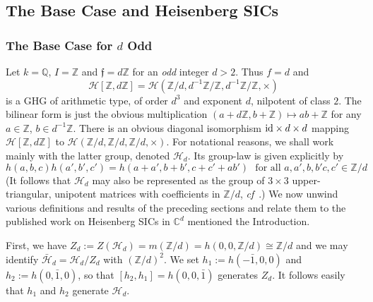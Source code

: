 \documentclass[12pt]{article}
\newcommand{\addwords}[1]{\ \ \ \mbox{#1}}
\newcommand{\bbC}{\ensuremath{\mathbb{C}}}\newcommand{\bbCp}{\ensuremath{\mathbb{C}_p}}
\newcommand{\bbQ}{\ensuremath{\mathbb{Q}}}
\newcommand{\bbZ}{\ensuremath{\mathbb{Z}}}
\newcommand{\cH}{\ensuremath{\mathcal{H}}}
\newcommand{\ff}{\ensuremath{\mathfrak{f}}}
\newcommand{\id}{{\rm id}}
\newcommand{\inv}{^{-1}}%
\newcommand{\Zover}[1]{\ensuremath{\bbZ/#1}}
\newcommand{\Zunder}[1]{#1 \inv\bbZ/\bbZ}
\begin{document}
\subsection{The Base Case and Heisenberg SICs}\label{subsec:the Base Case} 
\subsubsection{The Base Case for $d$ Odd}\label{subsubsection:base case odd d}
Let $k=\bbQ$, $I=\bbZ$ and $\ff=d\bbZ$ for an \textit{odd} integer $d>2$. Thus $f=d$ and 
$$
\cH[\bbZ,d\bbZ]=\cH(\Zover{d},\Zunder{d},\Zunder{d},\times)
$$  
is a GHG of arithmetic type, of order $d^3$ and exponent $d$, nilpotent of class $2$. The bilinear form is just the obvious multiplication
$(a+d\bbZ, b+\bbZ)\mapsto ab+\bbZ$ for any $a\in\bbZ$, $b\in d\inv\bbZ$. There is an obvious diagonal isomorphism $\id\times d\times d$ mapping $\cH[\bbZ,d\bbZ]$ to 
$\cH(\Zover{d},\Zover{d},\Zover{d},\times)$. For notational reasons, we shall work mainly with the latter group, denoted $\cH_d$. Its group-law  is given explicitly by  
$$
h(a,b,c)h(a',b',c')=h(a+ a',b + b',c +c '+ab')
\addwords{for all $a,a',b,b'c,c'\in\Zover{d}$}
$$
(It follows that $\cH_d$ may also be represented as the group of $3\times 3$ upper-triangular, unipotent matrices with coefficients in $\Zover{d}$, \textit{cf}~\cite{Wi: Heisenberg Gp}.) We now unwind various definitions and results of the preceding sections and relate them to the published work on Heisenberg SICs in $\bbC^d$ mentioned the Introduction.

First, we have  $Z_d:=Z(\cH_d)=m(\Zover{d})=h(0,0,\Zover{d})\cong{\Zover{d}}$ and we may identify $\bar{\cH}_d=\cH_d/Z_d$ with $(\Zover{d})^2$. 
We set $h_1:=h(-\bar 1,0,0)$ and $h_2:=h(0,\bar 1,0)$, so that $[h_2,h_1]=h(0,0,\bar 1)$ generates $Z_d$. It follows easily that $h_1$ and $h_2$ generate $\cH_d$. 
\end{document}
